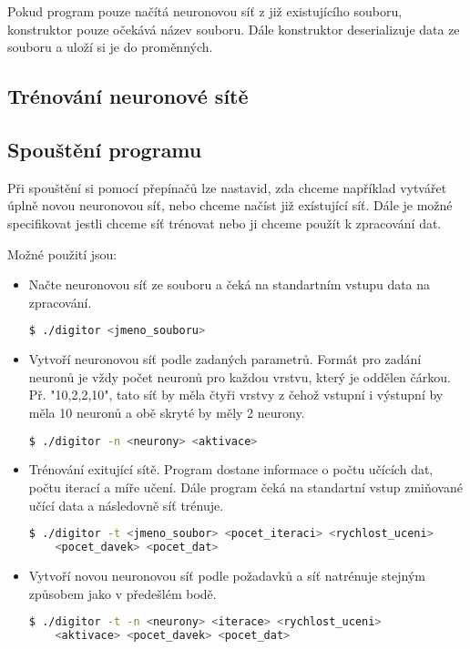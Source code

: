 Pokud program pouze načítá neuronovou síť z již existujícího souboru, konstruktor pouze očekává název souboru.
Dále konstruktor deserializuje data ze souboru a uloží si je do proměnných.

\subsection{Trénování neuronové sítě}

\subsection{Spouštění programu}
Při spouštění si pomocí přepínačů lze nastavid, zda chceme například vytvářet úplně novou neuronovou síť, nebo chceme načíst již exístující síť.
Dále je možné specifikovat jestli chceme síť trénovat nebo ji chceme použít k zpracování dat.

Možné použití jsou:
\begin{itemize}
    \item Načte neuronovou síť ze souboru a čeká na standartním vstupu data na zpracování.
    \begin{lstlisting}[language=bash, backgroundcolor=\color{backcolor}]
 $ ./digitor <jmeno_souboru>
    \end{lstlisting}

    \item Vytvoří neuronovou síť podle zadaných parametrů.
    Formát pro zadání neuronů je vždy počet neuronů pro každou vrstvu, který je oddělen čárkou.
    Př. "10,2,2,10", tato síť by měla čtyři vrstvy z čehož vstupní i výstupní by měla 10 neuronů a obě skryté by měly 2 neurony.
    \begin{lstlisting}[language=bash, backgroundcolor=\color{backcolor}]
 $ ./digitor -n <neurony> <aktivace>
    \end{lstlisting}

    \item Trénování exitující sítě. Program dostane informace o počtu učících dat, počtu iterací a míře učení.
    Dále program čeká na standartní vstup zmiňované učící data a následovně síť trénuje.
    \begin{lstlisting}[language=bash, backgroundcolor=\color{backcolor}]
 $ ./digitor -t <jmeno_soubor> <pocet_iteraci> <rychlost_uceni>
    <pocet_davek> <pocet_dat>
    \end{lstlisting}

    \item Vytvoří novou neuronovou síť podle požadavků a síť natrénuje stejným způsobem jako v předešlém bodě.
    \begin{lstlisting}[language=bash, backgroundcolor=\color{backcolor}]
 $ ./digitor -t -n <neurony> <iterace> <rychlost_uceni>
    <aktivace> <pocet_davek> <pocet_dat>
    \end{lstlisting}
\end{itemize}
